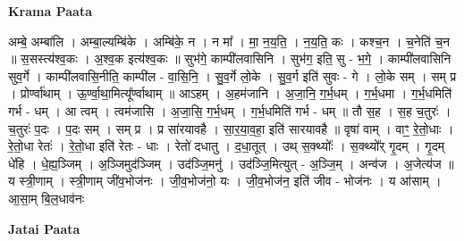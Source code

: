 \documentclass[17pt]{extarticle}
\begin{document}
\textbf{Krama Paata} \newline

अम्बे॒ अम्बा॑लि । अम्बा॒ल्यम्बि॑के । अम्बि॑के॒ न । न मा᳚ । मा॒ न॒य॒ति॒ । न॒य॒ति॒ कः । कश्च॒न । च॒नेति॑ च॒न ॥ स॒सस्त्य॑श्व॒कः । अ॒श्व॒क इत्य॑श्व॒कः ॥ सुभ॑गे॒ काम्पी॑लवासिनि । सुभ॑ग॒ इति॒ सु - भ॒गे॒ । काम्पी॑लवासिनि सुव॒र्गे । काम्पी॑लवासि॒नीति॒ काम्पी॑ल - वा॒सि॒नि॒ । सु॒व॒र्गे लो॒के । सु॒व॒र्ग इति॑ सुवः - गे । लो॒के सम् । सम् प्र । प्रोर्ण्वा॑थाम् । ऊ॒र्ण्वा॒था॒मित्यू᳚र्ण्वाथाम् ॥ आऽहम् । अ॒हम॑जानि । अ॒जा॒नि॒ ग॒र्भ॒धम् । ग॒र्भ॒धमा । ग॒र्भ॒धमिति॑ गर्भ - धम् । आ त्वम् । त्वम॑जासि । अ॒जा॒सि॒ ग॒र्भ॒धम् । ग॒र्भ॒धमिति॑ गर्भ - धम् ॥ तौ स॒ह । स॒ह च॒तुरः॑ । च॒तुरः॑ प॒दः । प॒दः सम् । सम् प्र । प्र सा॑रयावहै । सा॒र॒या॒व॒हा॒ इति॑ सारयावहै ॥ वृषा॑ वाम् । वाꣳ॒॒ रे॒तो॒धाः । रे॒तो॒धा रेतः॑ । रे॒तो॒धा इति॑ रेतः - धाः । रेतो॑ दधातु । द॒धा॒तूत् । उथ् स॒क्थ्योः᳚ । स॒क्थ्यो᳚र् गृ॒दम् । गृ॒दम् धे॑हि । धे॒ह्य॒ञ्जिम् । अ॒ञ्जिमुद॑ञ्जिम् । उद॑ञ्जि॒मनु॑ । उद॑ञ्जि॒मित्युत् - अ॒ञ्जि॒म् । अन्व॑ज । अ॒जेत्य॑ज ॥ य स्त्री॒णाम् । स्त्री॒णाम् जी॑व॒भोज॑नः । जी॒व॒भोज॑नो॒ यः । जी॒व॒भोज॑न॒ इति॑ जीव - भोज॑नः । य आ॑साम् । आ॒सा॒म् बि॒ल॒धाव॑नः \newline

\textbf{Jatai Paata} \newline
\end{document}
